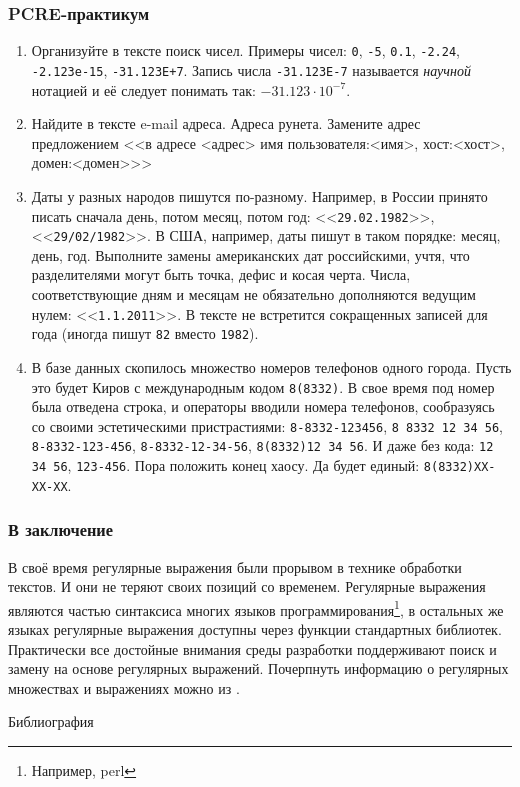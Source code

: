 \begin{frame}
    \frametitle{PCRE-практикум}

    \begin{enumerate}
        \item Организуйте в тексте поиск чисел. Примеры чисел: \verb"0", \verb"-5", \verb"0.1", \verb"-2.24", \verb"-2.123e-15", \verb"-31.123E+7". Запись числа \verb"-31.123E-7" называется \emph{научной} нотацией и её следует понимать так: $-31.123\cdot 10^{-7}$.
        
        \item Найдите в тексте e-mail адреса. Адреса рунета. Замените адрес предложением <<в адресе <адрес> имя пользователя:<имя>, хост:<хост>, домен:<домен>>>
        
        \item Даты у разных народов пишутся по-разному. Например, в России принято писать сначала день, потом месяц, потом год: <<\verb"29.02.1982">>, <<\verb"29/02/1982">>. В США, например, даты пишут в таком порядке: месяц, день, год. Выполните замены американских дат российскими, учтя, что разделителями могут быть точка, дефис и косая черта. Числа, соответствующие дням и месяцам не обязательно дополняются ведущим нулем: <<\verb"1.1.2011">>. В тексте не встретится сокращенных записей для года (иногда пишут \verb"82" вместо \verb"1982").
        
        \item В базе данных скопилось множество номеров телефонов одного города. Пусть это будет Киров с международным кодом \verb"8(8332)". В свое время под номер была отведена строка, и операторы вводили номера телефонов, сообразуясь со своими эстетическими пристрастиями: \verb"8-8332-123456", \verb"8 8332 12 34 56", \verb"8-8332-123-456", \verb"8-8332-12-34-56", \verb"8(8332)12 34 56". И даже без кода: \verb"12 34 56", \verb"123-456". Пора положить конец хаосу. Да будет единый: \verb"8(8332)XX-XX-XX".
    \end{enumerate} 
\end{frame}

\begin{frame}
    \frametitle{В заключение}
    
    В своё время регулярные выражения были прорывом в технике обработки текстов. И они не теряют своих позиций со временем. Регулярные выражения являются частью синтаксиса многих языков программирования\footnote{Например, perl}, в остальных же языках регулярные выражения доступны через функции стандартных библиотек. Практически все достойные внимания среды разработки поддерживают поиск и замену на основе регулярных выражений. Почерпнуть информацию о регулярных множествах и выражениях можно из \cite{bib:serebryakov:programminglang}.
\end{frame}

\begin{frame}[allowframebreaks]{Библиография}
    
    
\end{frame}

